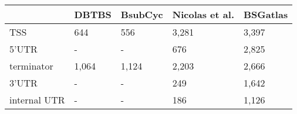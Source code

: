 
\begin{tabular}{lllll}
\toprule
  & DBTBS & BsubCyc & Nicolas et al. & BSGatlas\\
\midrule
TSS & 644 & 556 & 3,281 & 3,397\\
5'UTR & - & - & 676 & 2,825\\
terminator & 1,064 & 1,124 & 2,203 & 2,666\\
3'UTR & - & - & 249 & 1,642\\
internal UTR & - & - & 186 & 1,126\\
\bottomrule
\end{tabular}
